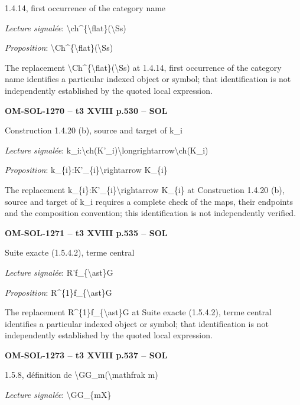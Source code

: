 1.4.14, first occurrence of the category name\par
\emph{Lecture signalée}: \textbackslash{}ch\textasciicircum{}\{\textbackslash{}flat\}(\textbackslash{}Ss)\par
\emph{Proposition}: \textbackslash{}Ch\textasciicircum{}\{\textbackslash{}flat\}(\textbackslash{}Ss)\par
The replacement \textbackslash{}Ch\textasciicircum{}\{\textbackslash{}flat\}(\textbackslash{}Ss) at 1.4.14, first occurrence of the category name identifies a particular indexed object or symbol; that identification is not independently established by the quoted local expression.\par
\par\noindent\textbf{OM-SOL-1270 -- t3 XVIII p.530 -- SOL}\par
Construction 1.4.20 (b), source and target of k\_i\par
\emph{Lecture signalée}: k\_i:\textbackslash{}ch(K'\_i)\textbackslash{}longrightarrow\textbackslash{}ch(K\_i)\par
\emph{Proposition}: k\_\{i\}:K'\_\{i\}\textbackslash{}rightarrow K\_\{i\}\par
The replacement k\_\{i\}:K'\_\{i\}\textbackslash{}rightarrow K\_\{i\} at Construction 1.4.20 (b), source and target of k\_i requires a complete check of the maps, their endpoints and the composition convention; this identification is not independently verified.\par
\par\noindent\textbf{OM-SOL-1271 -- t3 XVIII p.535 -- SOL}\par
Suite exacte (1.5.4.2), terme central\par
\emph{Lecture signalée}: R'f\_\{\textbackslash{}ast\}G\par
\emph{Proposition}: R\textasciicircum{}\{1\}f\_\{\textbackslash{}ast\}G\par
The replacement R\textasciicircum{}\{1\}f\_\{\textbackslash{}ast\}G at Suite exacte (1.5.4.2), terme central identifies a particular indexed object or symbol; that identification is not independently established by the quoted local expression.\par
\par\noindent\textbf{OM-SOL-1273 -- t3 XVIII p.537 -- SOL}\par
1.5.8, définition de \textbackslash{}GG\_m(\textbackslash{}mathfrak m)\par
\emph{Lecture signalée}: \textbackslash{}GG\_\{mX\}\par
